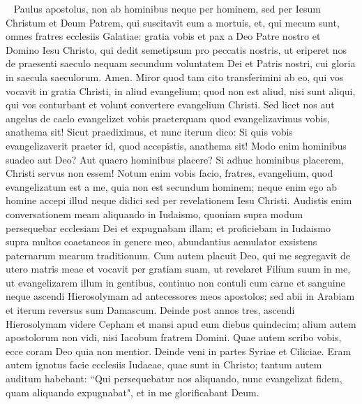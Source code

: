 
\begin{biblechapter}  
\verse Paulus apostolus, non ab hominibus neque per hominem, sed per Iesum Christum et Deum Patrem, qui suscitavit eum a mortuis, 
\verse et, qui mecum sunt, omnes fratres ecclesiis Galatiae: 
\verse gratia vobis et pax a Deo Patre nostro et Domino Iesu Christo, 
\verse qui dedit semetipsum pro peccatis nostris, ut eriperet nos de praesenti saeculo nequam secundum voluntatem Dei et Patris nostri, 
\verse cui gloria in saecula saeculorum. Amen. 
\verse Miror quod tam cito transferimini ab eo, qui vos vocavit in gratia Christi, in aliud evangelium; 
\verse quod non est aliud, nisi sunt aliqui, qui vos conturbant et volunt convertere evangelium Christi. 
\verse Sed licet nos aut angelus de caelo evangelizet vobis praeterquam quod evangelizavimus vobis, anathema sit!  
\verse Sicut praediximus, et nunc iterum dico: Si quis vobis evangelizaverit praeter id, quod accepistis, anathema sit! 
\verse Modo enim hominibus suadeo aut Deo? Aut quaero hominibus placere? Si adhuc hominibus placerem, Christi servus non essem! 
\verse Notum enim vobis facio, fratres, evangelium, quod evangelizatum est a me, quia non est secundum hominem; 
\verse neque enim ego ab homine accepi illud neque didici sed per revelationem Iesu Christi. 
\verse Audistis enim conversationem meam aliquando in Iudaismo, quoniam supra modum persequebar ecclesiam Dei et expugnabam illam; 
\verse et proficiebam in Iudaismo supra multos coaetaneos in genere meo, abundantius aemulator exsistens paternarum mearum traditionum. 
\verse Cum autem placuit Deo, qui me segregavit de utero matris meae et vocavit per gratiam suam, 
\verse ut revelaret Filium suum in me, ut evangelizarem illum in gentibus, continuo non contuli cum carne et sanguine  
\verse neque ascendi Hierosolymam ad antecessores meos apostolos; sed abii in Arabiam et iterum reversus sum Damascum. 
\verse Deinde post annos tres, ascendi Hierosolymam videre Cepham et mansi apud eum diebus quindecim; 
\verse alium autem apostolorum non vidi, nisi Iacobum fratrem Domini. 
\verse Quae autem scribo vobis, ecce coram Deo quia non mentior. 
\verse Deinde veni in partes Syriae et Ciliciae. 
\verse Eram autem ignotus facie ecclesiis Iudaeae, quae sunt in Christo; 
\verse tantum autem auditum habebant: “Qui persequebatur nos aliquando, nunc evangelizat fidem, quam aliquando expugnabat", 
\verse et in me glorificabant Deum. 
\end{biblechapter}

